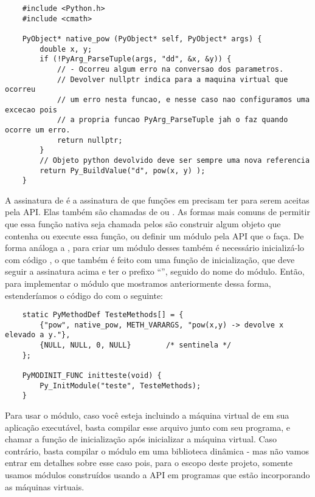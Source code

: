    \vspace{1em}
    \begin{lstlisting}
    #include <Python.h>
    #include <cmath>
    
    PyObject* native_pow (PyObject* self, PyObject* args) {
        double x, y;
        if (!PyArg_ParseTuple(args, "dd", &x, &y)) {
            // - Ocorreu algum erro na conversao dos parametros.
            // Devolver nullptr indica para a maquina virtual que ocorreu
            // um erro nesta funcao, e nesse caso nao configuramos uma excecao pois
            // a propria funcao PyArg_ParseTuple jah o faz quando ocorre um erro.
            return nullptr;
        }
        // Objeto python devolvido deve ser sempre uma nova referencia
        return Py_BuildValue("d", pow(x, y) );
    }
    \end{lstlisting}
    \vspace{1em}
    
    A assinatura de  é a assinatura de que funções em \C{} precisam ter
    para serem aceitas pela API. Elas também são chamadas de  ou
    . As formas mais comuns
    de permitir que essa função nativa seja chamada pelos  são construir algum 
    objeto que contenha ou execute essa função, ou definir um módulo pela API que o faça.
    De forma análoga a , para criar um módulo desses também é necessário
    inicializá-lo com código \C{},
    o que também é feito com uma função de inicialização, que deve seguir a assinatura acima
    e ter o prefixo ``'', seguido do nome do módulo. Então, para implementar o módulo
     que mostramos anteriormente dessa forma, estenderíamos o código do
     com o seguinte:
    
    \vspace{1em}
    \begin{lstlisting}
    static PyMethodDef TesteMethods[] = {
        {"pow", native_pow, METH_VARARGS, "pow(x,y) -> devolve x elevado a y."},
        {NULL, NULL, 0, NULL}        /* sentinela */
    };

    PyMODINIT_FUNC initteste(void) {
        Py_InitModule("teste", TesteMethods);
    }  
    \end{lstlisting}
    \vspace{1em}
    
    Para usar o módulo, caso você esteja incluindo a máquina virtual de 
    em sua aplicação executável, basta compilar esse arquivo junto com seu programa, 
    e chamar a função de inicialização  após inicializar a máquina 
    virtual. Caso contrário, basta compilar o módulo em uma biblioteca 
    dinâmica - mas não vamos entrar em detalhes sobre esse caso pois, para o escopo deste 
    projeto, somente usamos módulos construídos usando a API em programas que estão
    incorporando as máquinas virtuais.

